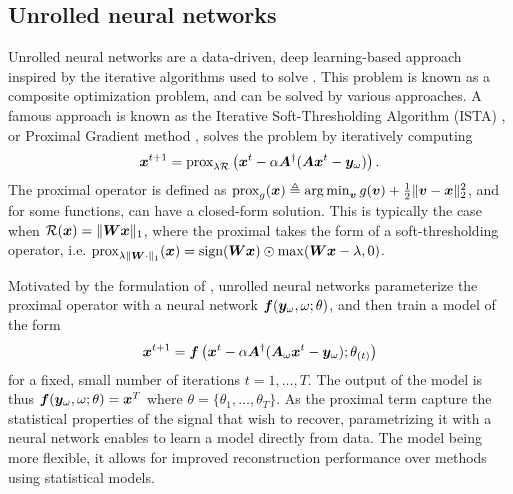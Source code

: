 \subsection{Unrolled neural networks}
Unrolled neural networks are a data-driven, deep learning-based approach inspired by the iterative algorithms used to solve . This problem is known as a composite optimization problem, and can be solved by various approaches. A famous approach is known as the Iterative Soft-Thresholding Algorithm (ISTA) \citep{daubechies2004iterative}, or Proximal Gradient method \citep{combettes2011proximal}, solves the problem by iteratively computing 
\begin{equation}
    {\bm{x}}^{t+1}=\text{prox}_{\lambda\mathcal{R}}\left({\bm{x}}^t-\alpha {\bm{A}}^\dagger({\bm{A}} {\bm{x}}^t-{\bm{y}}_\omega)\right).\label{eq:prox}
\end{equation}
The proximal operator is defined as $\text{prox}_{g}({\bm{x}}) \triangleq \operatorname*{arg\,min}_{\bm{v}} g({\bm{v}}) + \frac{1}{2}\|{\bm{v}}-{\bm{x}}\|_2^2$, and for some functions, can have a closed-form solution. This is typically the case when $\mathcal{R}({\bm{x}}) = \|{\bm{W}}{\bm{x}}\|_1$, where the proximal takes the form of a soft-thresholding operator, i.e. $\text{prox}_{
\lambda\|{\bm{W}}\cdot\|_1}({\bm{x}}) = \text{sign}({\bm{W}}{\bm{x}})\odot \max({\bm{W}}{\bm{x}}-\lambda,0)$. 

Motivated by the formulation of , unrolled neural networks parameterize the proximal operator with a neural network ${\bm{f}}({\bm{y}}_\omega,\omega; \theta)$, and then train a model of the form
\begin{equation}
    {\bm{x}}^{t+1} = {\bm{f}}\left({\bm{x}}^t-\alpha {\bm{A}}^\dagger({\bm{A}}_\omega {\bm{x}}^t-{\bm{y}}_\omega); \theta_{(t)}\right)
\end{equation}
for a fixed, small number of iterations $t=1,\ldots,T$. The output of the model is thus ${\bm{f}}({\bm{y}}_\omega,\omega; \theta)={\bm{x}}^T$ where $\theta = \{\theta_1,\ldots,\theta_T\}$. As the proximal term capture the statistical properties of the signal that wish to recover, parametrizing it with a neural network enables to learn a model directly from data. The model being more flexible, it allows for improved reconstruction performance over methods using statistical models.

